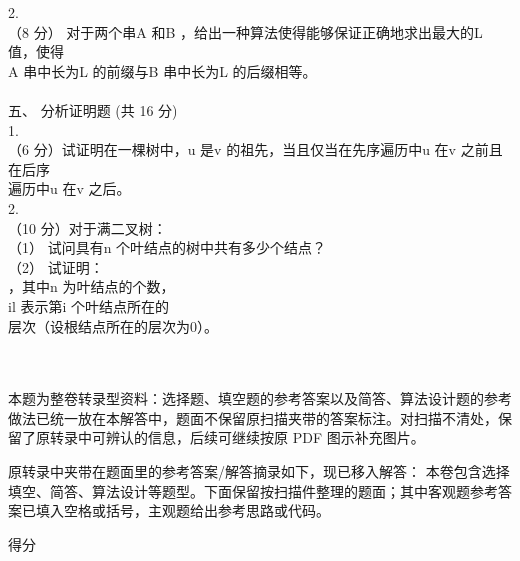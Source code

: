 \begin{question}
2.\\
（8 分） 对于两个串A 和B ，给出一种算法使得能够保证正确地求出最大的L 值，使得\\
A 串中长为L 的前缀与B 串中长为L 的后缀相等。\\
\\
五、 分析证明题 (共 16 分)\\
1.\\
（6 分）试证明在一棵树中，u 是v 的祖先，当且仅当在先序遍历中u 在v 之前且在后序\\
遍历中u 在v 之后。\\
2.\\
（10 分）对于满二叉树：\\
（1） 试问具有n 个叶结点的树中共有多少个结点？\\
（2） 试证明：\\
，其中n 为叶结点的个数，\\
il 表示第i 个叶结点所在的\\
层次（设根结点所在的层次为0）。\\
\\
\

\begin{solution}
本题为整卷转录型资料：选择题、填空题的参考答案以及简答、算法设计题的参考做法已统一放在本解答中，题面不保留原扫描夹带的答案标注。对扫描不清处，保留了原转录中可辨认的信息，后续可继续按原 PDF 图示补充图片。

\medskip
\noindent 原转录中夹带在题面里的参考答案/解答摘录如下，现已移入解答：
本卷包含选择填空、简答、算法设计等题型。下面保留按扫描件整理的题面；其中客观题参考答案已填入空格或括号，主观题给出参考思路或代码。

得分\\

\end{solution}
\end{question}
